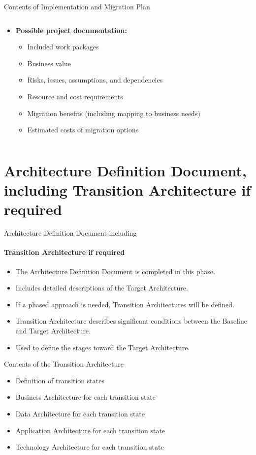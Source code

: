 \documentclass[aspectratio=169, table]{beamer}
\begin{document}
\begin{frame}{\LARGE{Contents of Implementation and Migration Plan}}
\begin{columns}[T]
		\begin{column}{0.48\textwidth}
			\begin{itemize}
				\item \textbf{Possible project documentation:}
				\begin{itemize}
					\item Included work packages
					\item Business value
					\item Risks, issues, assumptions, and dependencies
					\item Resource and cost requirements
					\item Migration benefits (including mapping to business needs)
					\item Estimated costs of migration options
				\end{itemize}
			\end{itemize}
		\end{column}
	\end{columns}
\end{frame}


\section{Architecture Definition Document, including Transition Architecture if required}

\begin{frame}{Architecture Definition Document including}
\framesubtitle{Transition Architecture if required}
	\begin{itemize}
		\item The Architecture Definition Document is completed in this phase.
		\item Includes detailed descriptions of the Target Architecture.
		\item If a phased approach is needed, Transition Architectures will be defined.
		\item Transition Architecture describes significant conditions between the Baseline and Target Architecture.
		\item Used to define the stages toward the Target Architecture.
	\end{itemize}
\end{frame}

\begin{frame}{Contents of the Transition Architecture}
	\begin{itemize}
		\item Definition of transition states
		\item Business Architecture for each transition state
		\item Data Architecture for each transition state
		\item Application Architecture for each transition state
		\item Technology Architecture for each transition state
	\end{itemize}
\end{frame}
\end{document}
